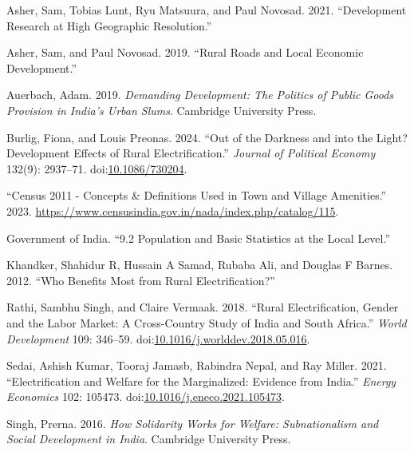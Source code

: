 \documentclass[
]{article}
\newlength{\cslhangindent}
\newlength{\cslentryspacingunit} %
\newenvironment{CSLReferences}[2] %
 {%
  \setlength{\parindent}{0pt}
  \ifodd #1
  \let\oldpar\par
  \def\par{\hangindent=\cslhangindent\oldpar}
  \fi
  \setlength{\parskip}{#2\cslentryspacingunit}
 }%
 {}
\begin{document}
\hypertarget{refs}{}
\begin{CSLReferences}{1}{0}
\leavevmode{}%
Asher, Sam, Tobias Lunt, Ryu Matsuura, and Paul Novosad. 2021.
{``Development Research at High Geographic Resolution.''}

\leavevmode{}%
Asher, Sam, and Paul Novosad. 2019. {``Rural Roads and Local Economic
Development.''}

\leavevmode{}%
Auerbach, Adam. 2019. \emph{Demanding Development: The Politics of
Public Goods Provision in India's Urban Slums}. Cambridge University
Press.

\leavevmode{}%
Burlig, Fiona, and Louis Preonas. 2024. {``Out of the Darkness and into
the Light? Development Effects of Rural Electrification.''}
\emph{Journal of Political Economy} 132(9): 2937--71.
doi:\href{https://doi.org/10.1086/730204}{10.1086/730204}.

\leavevmode{}%
{``Census 2011 - Concepts \& Definitions Used in Town and Village
Amenities.''} 2023.
\url{https://www.censusindia.gov.in/nada/index.php/catalog/115}.

\leavevmode{}%
Government of India. {``9.2 Population and Basic Statistics at the Local
Level.''}

\leavevmode{}%
Khandker, Shahidur R, Hussain A Samad, Rubaba Ali, and Douglas F Barnes.
2012. {``Who Benefits Most from Rural Electrification?''}

\leavevmode{}%
Rathi, Sambhu Singh, and Claire Vermaak. 2018. {``Rural Electrification,
Gender and the Labor Market: A Cross-Country Study of India and South
Africa.''} \emph{World Development} 109: 346--59.
doi:\href{https://doi.org/10.1016/j.worlddev.2018.05.016}{10.1016/j.worlddev.2018.05.016}.

\leavevmode{}%
Sedai, Ashish Kumar, Tooraj Jamasb, Rabindra Nepal, and Ray Miller.
2021. {``Electrification and Welfare for the Marginalized: Evidence from
India.''} \emph{Energy Economics} 102: 105473.
doi:\href{https://doi.org/10.1016/j.eneco.2021.105473}{10.1016/j.eneco.2021.105473}.

\leavevmode{}%
Singh, Prerna. 2016. \emph{How Solidarity Works for Welfare:
Subnationalism and Social Development in India}. Cambridge University
Press.


\end{CSLReferences}
\end{document}

